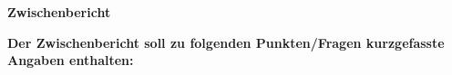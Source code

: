 \documentclass{article}
\begin{document}
\begin{center}
      \Large{\textbf{Zwischenbericht}}\\
\end{center}



\noindent\textbf{\Large Der Zwischenbericht soll zu folgenden Punkten/Fragen kurzgefasste Angaben enthalten:} \\ 







\end{document}
